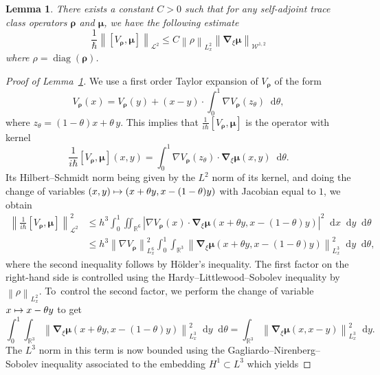 \documentclass[JEP,XML,SOM,Unicode,NoEqCountersInSection,published]{cedram}
\newcommand\mto{\mathchoice{\longmapsto}{\mapsto}{\mapsto}{\mapsto}}
\newtheorem{lem}{Lemma}[section]
\theoremstyle{definition}
\newcommand {\RR} {\mathbb R}
\newcommand {\Rd} {\RR^3}
\newcommand {\RRd} {\RR^6}
\renewcommand {\L} {\mathcal L}
\newcommand {\cW} {\mathcal W}
\let\lt\left
\let\rt\right
\renewcommand {\(} {\lt(}
\renewcommand {\)} {\rt)}
\newcommand {\com}[1] {\lt[{#1}\rt]}
\newcommand {\n}[1] {\lt\lvert #1 \rt\rvert}
\newcommand {\nrm}[1] {\lt\lVert #1\rt\rVert}
\newcommand {\Nrm}[2] {\nrm{#1}_{#2}}
\renewcommand {\d} {\mathop{}\!\mathrm{d}}
\DeclareMathOperator{\diag} {diag}
\newcommand {\Diag}[1] {\diag\!\( #1 \)}
\newcommand {\intd} {\int_{\Rd}}
\newcommand {\iintd} {\iint_{\RRd}}
\newcommand {\op} {\boldsymbol{\rho}}
\newcommand {\opmu} {\boldsymbol{\mu}}
\newcommand {\Dh} {\boldsymbol{\nabla}}
\newcommand {\Dhv}[1] {\Dh_{\!\xi} #1}
\begin{document}

\begin{lem}\label{lem:commutator_estimate_HS}
There exists a constant $C>0$ such that for any self-adjoint trace class operators $\op$ and $\opmu$, we have the following estimate
\begin{equation*}
\frac{1}{\hbar} \Nrm{\com{V_{\op},\opmu}}{\L^2} \leq C \Nrm{\rho}{L^2_x} \Nrm{\Dhv \opmu}{\cW^{1,2}}
\end{equation*}
where $\rho = \Diag{\op}$.
\end{lem}

\begin{proof}[Proof of Lemma~\ref{lem:commutator_estimate_HS}]
We use a first order Taylor expansion of $V_{\op}$ of the form
\begin{equation*}
V_{\op}(x) = V_{\op}(y) + \(x-y\)\cdot \int_0^1 \nabla V_{\op}(z_\theta)\d\theta,
\end{equation*}
where $z_\theta = \(1-\theta\)x+\theta\, y$. This implies that $\frac{1}{i\hbar}\com{V_{\op},\opmu}$ is the operator with kernel
\begin{equation*}
\frac{1}{i\hbar}\com{V_{\op},\opmu}(x,y) = \int_0^1 \nabla V_{\op}(z_\theta) \cdot \Dhv \opmu(x,y) \d\theta.
\end{equation*}
Its Hilbert--Schmidt norm being given by the $L^2$ norm of its kernel, and doing the change of variables $(x,y) \mto (x+\theta y, x-(1-\theta) y)$ with Jacobian equal to $1$, we obtain
\begin{align*}
\Nrm{\tfrac{1}{i\hbar}\com{V_{\op},\opmu}}{\L^2}^2 &\leq {h^3}\int_0^1\!\!\! \iintd \n{\nabla V_{\op}(x) \cdot \Dhv \opmu(x+\theta y,x-(1-\theta) y)}^2\d x\d y \d\theta
\\[-3pt]
&\leq {h^3} \Nrm{\nabla V_{\op}}{L_x^6}^2 \int_0^1\!\!\! \intd \Nrm{\Dhv \opmu(x+\theta y,x-(1-\theta) y)}{L^3_x}^2 \d y \d\theta,
\end{align*}
where the second inequality follows by Hölder's inequality. The first factor on the right-hand side is controlled using the Hardy--Littlewood--Sobolev inequality by $\Nrm{\rho}{L^2_x}$. To~control the second factor, we perform the change of variable $x\mto x-\theta y$ to get\vspace*{-3pt}
\begin{equation*}
\int_0^1\!\!\! \intd \Nrm{\Dhv \opmu(x+\theta y,x-(1-\theta) y)}{L^3_x}^2 \d y \d\theta = \intd \Nrm{\Dhv \opmu(x,x-y)}{L^3_x}^2 \d y.
\end{equation*}
The $L^3$ norm in this term is now bounded using the Gagliardo--Nirenberg--Sobolev inequality associated to the embedding $H^1\subset L^3$ which yields

\end{proof}
\end{document}
